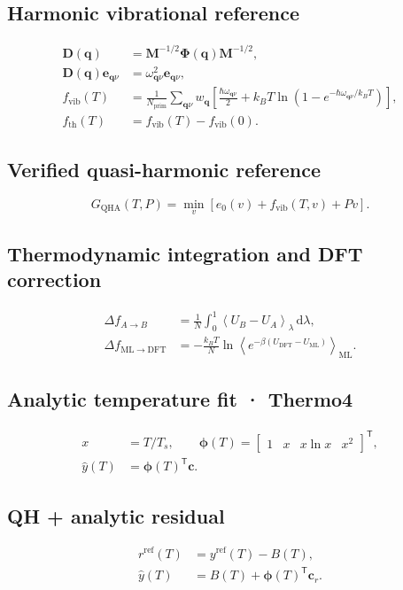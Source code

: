 \documentclass{article}
\begin{document}
\subsection*{Harmonic vibrational reference}
\[\begin{aligned}\mathbf D(\mathbf q)&=\mathbf M^{-1/2}\boldsymbol\Phi(\mathbf q)\mathbf M^{-1/2},\\\mathbf D(\mathbf q)\mathbf e_{\mathbf q\nu}&=\omega_{\mathbf q\nu}^2\mathbf e_{\mathbf q\nu},\\f_{\mathrm{vib}}(T)&=\frac{1}{N_{\mathrm{prim}}}\sum_{\mathbf q\nu}w_{\mathbf q}\!\left[\frac{\hbar\omega_{\mathbf q\nu}}2+k_BT\ln\!\left(1-e^{-\hbar\omega_{\mathbf q\nu}/k_BT}\right)\right],\\f_{\mathrm{th}}(T)&=f_{\mathrm{vib}}(T)-f_{\mathrm{vib}}(0).\end{aligned}\]
\subsection*{Verified quasi-harmonic reference}
\[G_{\mathrm{QHA}}(T,P)=\min_v\!\left[e_0(v)+f_{\mathrm{vib}}(T,v)+Pv\right].\]
\subsection*{Thermodynamic integration and DFT correction}
\[\begin{aligned}\Delta f_{A\to B}&=\frac1N\int_0^1\!\left\langle U_B-U_A\right\rangle_\lambda\,\mathrm d\lambda,\\\Delta f_{\mathrm{ML}\to\mathrm{DFT}}&=-\frac{k_BT}{N}\ln\!\left\langle e^{-\beta(U_{\mathrm{DFT}}-U_{\mathrm{ML}})}\right\rangle_{\mathrm{ML}}.\end{aligned}\]
\subsection*{Analytic temperature fit · Thermo4}
\[\begin{aligned}x&=T/T_s,\qquad \boldsymbol\phi(T)=\begin{bmatrix}1&x&x\ln x&x^2\end{bmatrix}^{\!\mathsf T},\\ \hat y(T)&=\boldsymbol\phi(T)^{\mathsf T}\mathbf c.\end{aligned}\]
\subsection*{QH + analytic residual}
\[\begin{aligned}r^{\mathrm{ref}}(T)&=y^{\mathrm{ref}}(T)-B(T),\\\hat y(T)&=B(T)+\boldsymbol\phi(T)^{\mathsf T}\mathbf c_r.\end{aligned}\]
\end{document}
